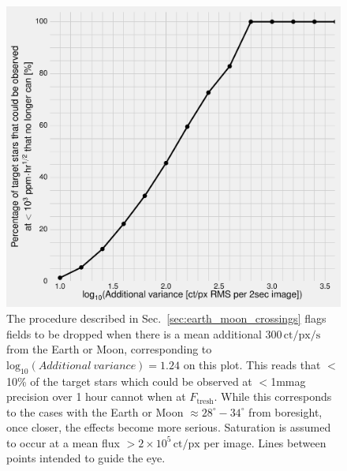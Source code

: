 \begin{figure}[!th] %
	\centering
	\includegraphics{figures/outage_vs_addedRMS}
	\caption{The procedure described in 
	Sec.~\protect\ref{sec:earth_moon_crossings} flags fields to be dropped when 
	there is a mean additional $300\,\mathrm{ct/px/s}$ from the Earth or Moon, 
	corresponding to $\mathrm{log_{10}}(Additional\ variance) = 1.24$ on this 
	plot.
	This reads that $<$10\% of the target stars which could be observed at 		
	$<$1mmag precision over 1 hour cannot when at $F_\mathrm{tresh}$. 
	While this corresponds to the cases with the Earth or Moon 
	$\approx 28^\circ - 34^\circ$ from boresight, once closer, the effects 
	become more serious. 
	Saturation is assumed to occur at a mean flux $> 
	2\times10^{5}\,\mathrm{ct/px}$ per 
	image. 
	Lines between points intended to guide the eye.}
	\label{fig:outage_vs_background}
\end{figure}
\newpage
